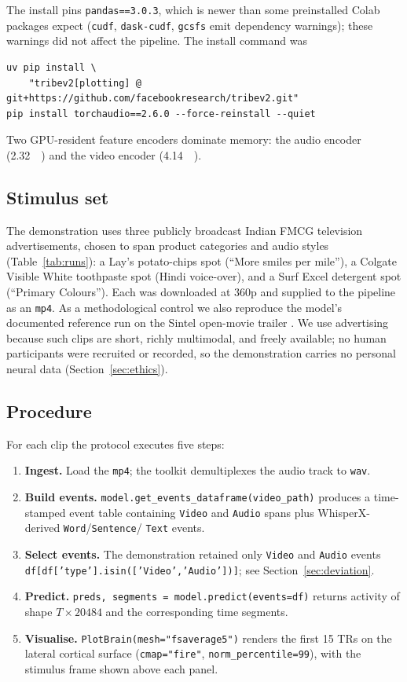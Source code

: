 \documentclass[11pt]{article}
\begin{document}
\noindent The install pins \texttt{pandas==3.0.3}, which is newer than some
preinstalled Colab packages expect (\texttt{cudf}, \texttt{dask-cudf},
\texttt{gcsfs} emit dependency warnings); these warnings did not affect the
pipeline. The install command was
{\footnotesize
\begin{verbatim}
uv pip install \
    "tribev2[plotting] @ git+https://github.com/facebookresearch/tribev2.git"
pip install torchaudio==2.6.0 --force-reinstall --quiet
\end{verbatim}
}
Two GPU-resident feature encoders dominate memory: the audio encoder
(\SI{2.32}{\giga\byte}) and the video encoder (\SI{4.14}{\giga\byte}).

\subsection{Stimulus set}
\label{sec:stimuli}
The demonstration uses three publicly broadcast Indian FMCG television
advertisements, chosen to span product categories and audio styles
(Table~\ref{tab:runs}): a Lay's potato-chips spot (``More smiles per mile''), a
Colgate Visible White toothpaste spot (Hindi voice-over), and a Surf Excel
detergent spot (``Primary Colours''). Each was downloaded at 360p and supplied
to the pipeline as an \texttt{mp4}. As a methodological control we also
reproduce the model's documented reference run on the Sintel open-movie trailer
\citep{sintel}. We use advertising because such clips are short, richly
multimodal, and freely available; no human participants were recruited or
recorded, so the demonstration carries no personal neural data
(Section~\ref{sec:ethics}).

\subsection{Procedure}
\label{sec:procedure}
For each clip the protocol executes five steps:
\begin{enumerate}[leftmargin=1.5em,itemsep=0.12em,topsep=0.2em]
  \item \textbf{Ingest.} Load the \texttt{mp4}; the toolkit demultiplexes the
  audio track to \texttt{wav}.
  \item \textbf{Build events.} \texttt{model.get\_events\_dataframe(video\_path)}
  produces a time-stamped event table containing \texttt{Video} and
  \texttt{Audio} spans plus WhisperX-derived \texttt{Word}/\texttt{Sentence}/
  \texttt{Text} events.
  \item \textbf{Select events.} The demonstration retained only
  \texttt{Video} and \texttt{Audio} events\\
  {\footnotesize\texttt{df[df['type'].isin(['Video','Audio'])]}}; see
  Section~\ref{sec:deviation}.
  \item \textbf{Predict.} \texttt{preds, segments = model.predict(events=df)}
  returns activity of shape $T \times 20484$ and the corresponding time
  segments.
  \item \textbf{Visualise.} \texttt{PlotBrain(mesh="fsaverage5")} renders the
  first 15 TRs on the lateral cortical surface (\texttt{cmap="fire"},
  \texttt{norm\_percentile=99}), with the stimulus frame shown above each panel.
\end{enumerate}
\end{document}
